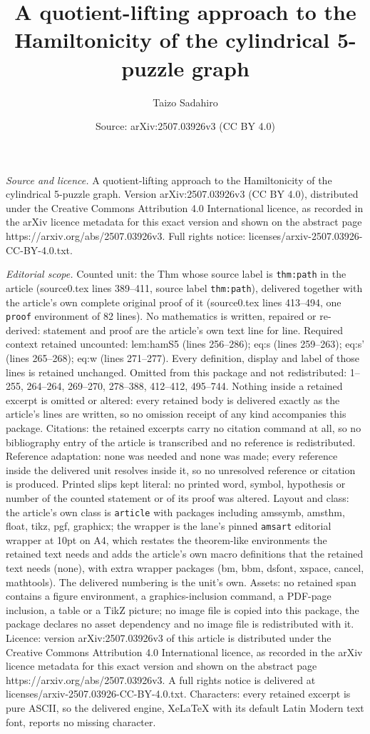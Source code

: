 \documentclass[10pt,a4paper]{amsart}
\title[A quotient-lifting approach to the Hamiltonicity of the cyli]{A quotient-lifting approach to the Hamiltonicity of the cylindrical 5-puzzle graph}
\author{Taizo Sadahiro}
\date{Source: arXiv:2507.03926v3 (CC BY 4.0)}
\begin{document}
\maketitle

\noindent\emph{Source and licence.} A quotient-lifting approach to the Hamiltonicity of the cylindrical 5-puzzle graph. Version arXiv:2507.03926v3 (CC BY 4.0), distributed under the Creative Commons Attribution 4.0 International licence, as recorded in the arXiv licence metadata for this exact version and shown on the abstract page https://arxiv.org/abs/2507.03926v3. Full rights notice: licenses/arxiv-2507.03926-CC-BY-4.0.txt.\par\smallskip

\noindent\textit{Editorial scope.} Counted unit: the Thm whose source label is \texttt{thm:path} in the article (source0.tex lines 389--411, source label \texttt{thm:path}), delivered together with the article's own complete original proof of it (source0.tex lines 413--494, one \texttt{proof} environment of 82 lines). No mathematics is written, repaired or re-derived: statement and proof are the article's own text line for line. Required context retained uncounted: lem:hamS5 (lines 256--286); eq:s (lines 259--263); eq:s' (lines 265--268); eq:w (lines 271--277). Every definition, display and label of those lines is retained unchanged. Omitted from this package and not redistributed: 1--255, 264--264, 269--270, 278--388, 412--412, 495--744. Nothing inside a retained excerpt is omitted or altered: every retained body is delivered exactly as the article's lines are written, so no omission receipt of any kind accompanies this package. Citations: the retained excerpts carry no citation command at all, so no bibliography entry of the article is transcribed and no reference is redistributed. Reference adaptation: none was needed and none was made; every reference inside the delivered unit resolves inside it, so no unresolved reference or citation is produced. Printed slips kept literal: no printed word, symbol, hypothesis or number of the counted statement or of its proof was altered. Layout and class: the article's own class is \texttt{article} with packages including amssymb, amsthm, float, tikz, pgf, graphicx; the wrapper is the lane's pinned \texttt{amsart} editorial wrapper at 10pt on A4, which restates the theorem-like environments the retained text needs and adds the article's own macro definitions that the retained text needs (none), with extra wrapper packages (bm, bbm, dsfont, xspace, cancel, mathtools). The delivered numbering is the unit's own. Assets: no retained span contains a figure environment, a graphics-inclusion command, a PDF-page inclusion, a table or a TikZ picture; no image file is copied into this package, the package declares no asset dependency and no image file is redistributed with it. Licence: version arXiv:2507.03926v3 of this article is distributed under the Creative Commons Attribution 4.0 International licence, as recorded in the arXiv licence metadata for this exact version and shown on the abstract page https://arxiv.org/abs/2507.03926v3. A full rights notice is delivered at licenses/arxiv-2507.03926-CC-BY-4.0.txt. Characters: every retained excerpt is pure ASCII, so the delivered engine, XeLaTeX with its default Latin Modern text font, reports no missing character.
\end{document}
